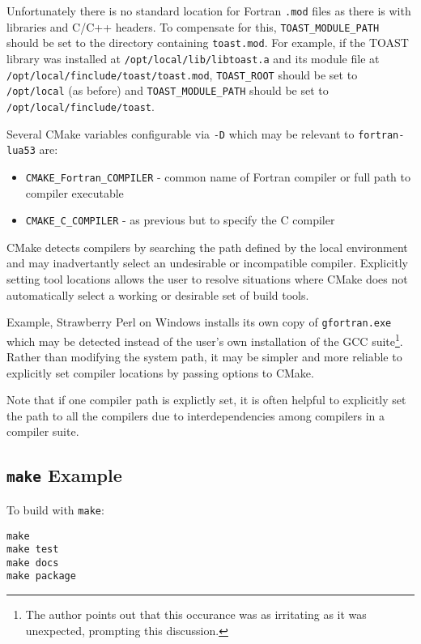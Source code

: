 Unfortunately there is no standard location for Fortran \texttt{.mod}
files as there is with libraries and C/C++ headers. To compensate for this,
\texttt{TOAST\_MODULE\_PATH} should be set to the directory containing
\texttt{toast.mod}. For example, if the TOAST library was installed at
\texttt{/opt/local/lib/libtoast.a} and its module file at
\texttt{/opt/local/finclude/toast/toast.mod}, \texttt{TOAST\_ROOT}
should be set to \texttt{/opt/local} (as before) and
\texttt{TOAST\_MODULE\_PATH} should be set to
\texttt{/opt/local/finclude/toast}.

Several CMake variables configurable via \texttt{-D} which may be relevant
to \texttt{fortran-lua53} are:

\begin{itemize}
    \item \texttt{CMAKE\_Fortran\_COMPILER} - common name of Fortran compiler or full path to compiler executable
    \item \texttt{CMAKE\_C\_COMPILER} - as previous but to specify the C compiler
\end{itemize}

CMake detects compilers by searching the path defined by the local
environment and may inadvertantly select an undesirable or incompatible
compiler. Explicitly setting tool locations allows the user to resolve
situations where CMake does not automatically select a working or
desirable set of build tools.

Example, Strawberry Perl on Windows installs its own copy of
\texttt{gfortran.exe} which may be detected instead of the user's own
installation of the GCC suite\footnote{The author points out that this occurance
was as irritating as it was unexpected, prompting this discussion.}.
Rather than modifying the system path, it may be simpler and more reliable
to explicitly set compiler locations by passing options to CMake.

Note that if one compiler path is explictly set, it is often helpful
to explicitly set the path to all the compilers due to interdependencies
among compilers in a compiler suite.

\subsection{\texttt{make} Example}

To build with \texttt{make}:

\begin{Verbatim}
make
make test
make docs
make package
\end{Verbatim}

